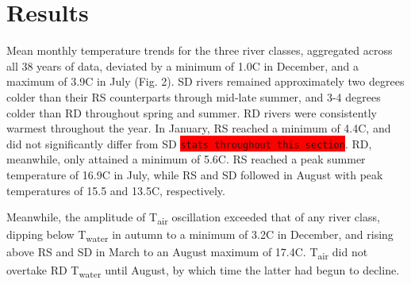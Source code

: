 \documentclass[notitlepage]{article}
\begin{document}
\section*{Results}

Mean monthly temperature trends for the three river classes, aggregated across all 38 years of data, deviated by a minimum of 1.0\degree C in December, and a maximum of 3.9\degree C in July (Fig. 2). SD rivers remained approximately two degrees colder than their RS counterparts through mid-late summer, and 3-4 degrees colder than RD throughout spring and summer. RD rivers were consistently warmest throughout the year. In January, RS reached a minimum of 4.4\degree C, and did not significantly differ from SD \colorbox{red}{\lstinline{stats throughout this section}}. RD, meanwhile, only attained a minimum of 5.6\degree C. RS reached a peak summer temperature of 16.9\degree C in July, while RS and SD followed in August with peak temperatures of 15.5 and 13.5\degree C, respectively.

Meanwhile, the amplitude of T\textsubscript{air} oscillation exceeded that of any river class, dipping below T\textsubscript{water} in autumn to a minimum of 3.2\degree C in December, and rising above RS and SD in March to an August maximum of 17.4\degree C. T\textsubscript{air} did not overtake RD T\textsubscript{water} until August, by which time the latter had begun to decline.

\begin{center}
\end{center}
\end{document}
